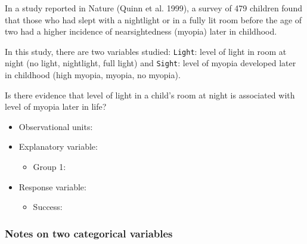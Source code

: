 \documentclass[
]{report}
\providecommand{\tightlist}{%
  \setlength{\itemsep}{0pt}\setlength{\parskip}{0pt}}
\begin{document}
In a study reported in Nature (Quinn et al. 1999), a survey of 479 children found that those who had slept with a nightlight or in a fully lit room before the age of two had a higher incidence of nearsightedness (myopia) later in childhood.

In this study, there are two variables studied: \texttt{Light}: level of light in room at night (no light, nightlight, full light) and \texttt{Sight}: level of myopia developed later in childhood (high myopia, myopia, no myopia).

Is there evidence that level of light in a child's room at night is associated with level of myopia later in life?

\vspace{2mm}

\begin{itemize}
\tightlist
\item
  Observational units:
\end{itemize}

\vspace{2mm}

\begin{itemize}
\item
  Explanatory variable:

  \begin{itemize}
  \tightlist
  \item
    Group 1:
  \end{itemize}
\end{itemize}

\vspace{2mm}

\begin{itemize}
\item
  Response variable:

  \begin{itemize}
  \tightlist
  \item
    Success:
  \end{itemize}
\end{itemize}

\vspace{2mm}

\subsubsection*{Notes on two categorical variables}\label{notes-on-two-categorical-variables}

\vspace{2in}
\end{document}
